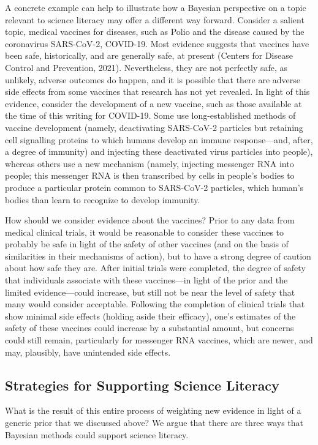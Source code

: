 \documentclass[man]{apa7}
\begin{document}
A concrete example can help to illustrate how a Bayesian perspective on a topic relevant to science literacy may offer a different way forward. Consider a salient topic, medical vaccines for diseases, such as Polio and the disease caused by the coronavirus SARS-CoV-2, COVID-19. Most evidence suggests that vaccines have been safe, historically, and are generally safe, at present (Centers for Disease Control and Prevention, 2021). Nevertheless, they are not perfectly safe, as unlikely, adverse outcomes do happen, and it is possible that there are adverse side effects from some vaccines that research has not yet revealed. In light of this evidence, consider the development of a new vaccine, such as those available at the time of this writing for COVID-19. Some use long-established methods of vaccine development (namely, deactivating SARS-CoV-2 particles but retaining cell signalling proteins to which humans develop an immune response—and, after, a degree of immunity) and injecting these deactivated virus particles into people), whereas others use a new mechanism (namely, injecting messenger RNA into people; this messenger RNA is then transcribed by cells in people’s bodies to produce a particular protein common to SARS-CoV-2 particles, which human’s bodies than learn to recognize to develop immunity.

How should we consider evidence about the vaccines? Prior to any data from medical clinical trials, it would be reasonable to consider these vaccines to probably be safe in light of the safety of other vaccines (and on the basis of similarities in their mechanisms of action), but to have a strong degree of caution about how safe they are. After initial trials were completed, the degree of safety that individuals associate with these vaccines—in light of the prior and the limited evidence—could increase, but still not be near the level of safety that many would consider acceptable. Following the completion of clinical trials that show minimal side effects (holding aside their efficacy), one’s estimates of the safety of these vaccines could increase by a substantial amount, but concerns could still remain, particularly for messenger RNA vaccines, which are newer, and may, plausibly, have unintended side effects.

\subsection{Strategies for Supporting Science Literacy}

What is the result of this entire process of weighting new evidence in light of a generic prior that we discussed above? We argue that there are three ways that Bayesian methods could support science literacy. 
\end{document}
